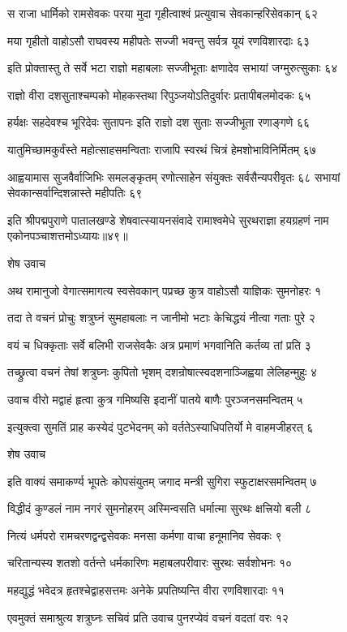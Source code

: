 स राजा धार्मिको रामसेवकः परया मुदा
गृहीत्वाश्वं प्रत्युवाच सेवकान्हरिसेवकान् ६२

मया गृहीतो वाहोऽसौ राघवस्य महीपतेः
सज्जी भवन्तु सर्वत्र यूयं रणविशारदाः ६३

इति प्रोक्तास्तु ते सर्वे भटा राज्ञो महाबलाः
सज्जीभूताः क्षणादेव सभायां जग्मुरुत्सुकाः ६४

राज्ञो वीरा दशसुताश्चम्पको मोहकस्तथा
रिपुञ्जयोऽतिदुर्वारः प्रतापीबलमोदकः ६५

हर्यक्षः सहदेवश्च भूरिदेवः सुतापनः
इति राज्ञो दश सुताः सज्जीभूता रणाङ्गणे ६६

यातुमिच्छामकुर्वंस्ते महोत्साहसमन्विताः
राजापि स्वरथं चित्रं हेमशोभाविनिर्मितम् ६७

आह्वयामास सुजवैर्वाजिभिः समलङ्कृतम्
रणोत्साहेन संयुक्तः सर्वसैन्यपरीवृतः ६८
सभायां सेवकान्सर्वान्दिशन्नास्ते महीपतिः ६९

इति श्रीपद्मपुराणे पातालखण्डे शेषवात्स्यायनसंवादे रामाश्वमेधे सुरथराज्ञा हयग्रहणं नाम एकोनपञ्चाशत्तमोऽध्यायः॥४९॥


शेष उवाच

अथ रामानुजो वेगात्समागत्य स्वसेवकान्
पप्रच्छ कुत्र वाहोऽसौ याज्ञिकः सुमनोहरः १

तदा ते वचनं प्रोचुः शत्रुघ्नं सुमहाबलाः
न जानीमो भटाः केचिद्धयं नीत्वा गताः पुरे २

वयं च धिक्कृताः सर्वे बलिभी राजसेवकैः
अत्र प्रमाणं भगवानिति कर्तव्य तां प्रति ३

तच्छ्रुत्वा वचनं तेषां शत्रुघ्नः कुपितो भृशम्
दशन्रोषात्स्वदशनाञ्जिह्वया लेलिहन्मुहुः ४

उवाच वीरो मद्वाहं हृत्वा कुत्र गमिष्यसि
इदानीं पातये बाणैः पुरञ्जनसमन्वितम् ५

इत्युक्त्वा सुमतिं प्राह कस्येदं पुटभेदनम्
को वर्ततेऽस्याधिपतिर्यो मे वाहमजीहरत् ६

शेष उवाच

इति वाक्यं समाकर्ण्य भूपतेः कोपसंयुतम्
जगाद मन्त्री सुगिरा स्फुटाक्षरसमन्वितम् ७

विद्धीदं कुण्डलं नाम नगरं सुमनोहरम्
अस्मिन्वसति धर्मात्मा सुरथः क्षत्त्रियो बली ८

नित्यं धर्मपरो रामचरणद्वन्द्वसेवकः
मनसा कर्मणा वाचा हनूमानिव सेवकः ९

चरितान्यस्य शतशो वर्तन्ते धर्मकारिणः
महाबलपरीवारः सुरथः सर्वशोभनः १०

महद्युद्धं भवेदत्र हृतश्चेद्वाहसत्तमः
अनेके प्रपतिष्यन्ति वीरा रणविशारदाः ११

एवमुक्तं समाश्रुत्य शत्रुघ्नः सचिवं प्रति
उवाच पुनरप्येवं वचनं वदतां वरः १२

